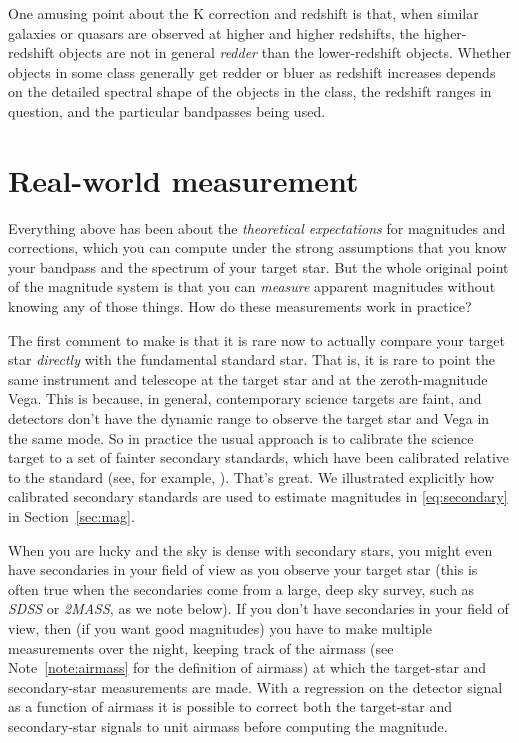 \documentclass[10pt]{article}
\newcommand{\sectionname}{Section}
\newcommand{\secref}[1]{\sectionname~\ref{#1}}
\newcommand{\noteref}[1]{Note~\ref{#1}}
\begin{document}
One amusing point about the K correction and redshift is that, when similar galaxies or quasars are observed at higher and higher redshifts, the higher-redshift objects are not in general \emph{redder} than the lower-redshift objects.
Whether objects in some class generally get redder or bluer as redshift increases depends on the detailed spectral shape of the objects in the class, the redshift ranges in question, and the particular bandpasses being used.

\section{Real-world measurement}\label{sec:practice}

Everything above has been about the \emph{theoretical expectations} for magnitudes and corrections, which you can compute under the strong assumptions that you know your bandpass and the spectrum of your target star.
But the whole original point of the magnitude system is that you can \emph{measure} apparent magnitudes without knowing any of those things.
How do these measurements work in practice?

The first comment to make is that it is rare now to actually compare your target star \emph{directly} with the fundamental standard star.
That is, it is rare to point the same instrument and telescope at the target star and at the zeroth-magnitude Vega.
This is because, in general, contemporary science targets are faint, and detectors don't have the dynamic range to observe the target star and Vega in the same mode.
So in practice the usual approach is to calibrate the science target to a set of fainter secondary standards, which have been calibrated relative to the standard (see, for example, \cite{landolt}).
That's great.
We illustrated explicitly how calibrated secondary standards are used to estimate magnitudes in \eqref{eq:secondary} in \secref{sec:mag}.

When you are lucky and the sky is dense with secondary stars, you might even have secondaries in your field of view as you observe your target star (this is often true when the secondaries come from a large, deep sky survey, such as \textsl{SDSS} or \textsl{2MASS}, as we note below).
If you don't have secondaries in your field of view, then (if you want good magnitudes) you have to make multiple measurements over the night, keeping track of the airmass (see \noteref{note:airmass} for the definition of airmass) at which the target-star and secondary-star measurements are made.
With a regression on the detector signal as a function of airmass it is possible to correct both the target-star and secondary-star signals to unit airmass before computing the magnitude.
\end{document}
